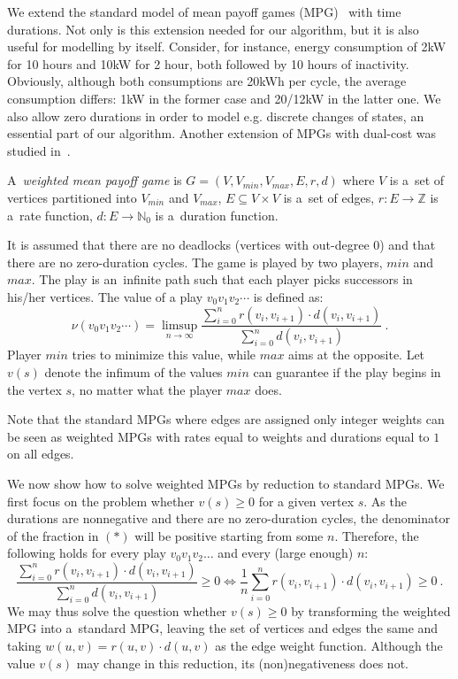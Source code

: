 We extend the standard model of mean payoff games (MPG)~\cite{em79mpg} with time durations. Not only is this extension needed for our algorithm, but it is also useful for modelling by itself. Consider, for instance, energy consumption of 2kW for 10 hours and 10kW for 2 hour, both followed by 10 hours of inactivity. Obviously, although both consumptions are 20kWh per cycle, the average consumption differs: 1kW in the former case and 20/12kW in the latter one. 
We also allow zero durations in order to model e.g. discrete changes of states,
an essential part of our algorithm.
Another extension of MPGs with dual-cost was studied in~\cite{BloemGHJ09}.

\begin{definition}
A~\emph{weighted mean payoff game} is $G = (V, V_{min}, V_{max}, E, r, d)$
where $V$ is a~set of vertices partitioned into $V_{min}$ and $V_{max}$, $E
\subseteq V \times V$ is a~set of edges, $r : E \to \mathbb Z$ is a~rate
function, $d : E \to \mathbb N_0$ is a~duration function. 
\end{definition}
It is assumed that there are no deadlocks (vertices with out-degree 0) and that
there are no zero-duration cycles.  The game is played by two players, $min$
and $max$.  The play is an~infinite path such that each player picks successors in his/her vertices. The value of a play $v_0v_1v_2\cdots$ is defined as:
\[ \nu(v_0v_1v_2\cdots) = \limsup_{n\to\infty} \frac{\sum_{i = 0}^{n} 
  	r(v_i,v_{i+1}) \cdot d(v_i,v_{i+1})}
       {\sum_{i = 0}^{n} d(v_i,v_{i+1})} \ .
       \tag{$*$} 
\]
Player $min$ tries to minimize this value, while $max$ aims at the opposite. Let $v(s)$ denote the infimum of the values $min$ can guarantee if the play begins in the vertex $s$, no matter what the player $max$ does.

Note that the standard MPGs where edges are assigned only integer weights  
can be seen as weighted MPGs with rates equal to weights and
durations equal to $1$ on all edges.



We now show how to solve weighted MPGs by reduction to standard MPGs.
We first focus on the problem whether $v(s) \ge 0$ for a given
vertex $s$. As the durations are nonnegative and there are no
zero-duration cycles, the denominator of the fraction in $(*)$ will 
be positive starting from some $n$. 
Therefore, the following holds for every play
$v_0v_1v_2\ldots$ and every (large enough) $n$:
\[
 \frac{\sum_{i = 0}^{n} 
  	r(v_i,v_{i+1}) \cdot d(v_i,v_{i+1})}
       {\sum_{i = 0}^{n} d(v_i,v_{i+1})}
       \ge 0
\Leftrightarrow
 \frac{1}{n}\sum_{i = 0}^{n} 
  	r(v_i,v_{i+1}) \cdot d(v_i,v_{i+1})\ge 0 \ .
\]
We may thus solve the question whether $v(s) \ge 0$ by transforming the
weighted MPG into a~standard MPG, leaving the set of vertices and edges the
same and taking $w(u,v) = r(u,v) \cdot d(u,v)$ as the edge weight function.
Although the value $v(s)$ may change in this reduction, its (non)negativeness
does not.

